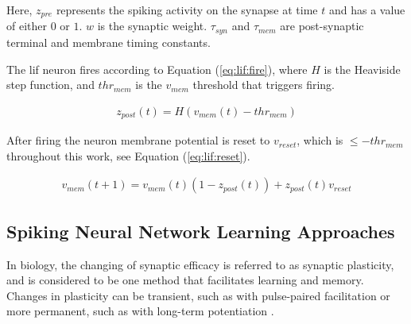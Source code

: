 \documentclass[conference]{IEEEtran}
\newcommand{\asvgf}[4]{
	\begin{figure}[!htbp]
    	\centering
		\adjustbox{max width=#4\linewidth}{}
        \caption{#2.}
        \label{#3}
	\end{figure}
}
\newcommand{\eq}[1]{Equation (\ref{#1})}
\begin{document}
Here, $z_{pre}$ represents the spiking activity on the synapse at time $t$ and
has a value of either $0$ or $1$. $w$ is the synaptic weight. $\tau_{syn}$ and
$\tau_{mem}$ are post-synaptic terminal and membrane timing constants.

The \gls{lif} neuron fires according to \eq{eq:lif:fire}, where $H$ is the
Heaviside step function, and $thr_{mem}$ is the $v_{mem}$ threshold that
triggers firing.

\begin{align}
z_{post}(t) = H(v_{mem}(t) - thr_{mem}) \label{eq:lif:fire}
\end{align}

After firing the neuron membrane potential is reset to $v_{reset}$, which is
$\leq -thr_{mem}$ throughout this work, see \eq{eq:lif:reset}.

\begin{align}
v_{mem}(t+1) = v_{mem}(t)(1 - z_{post}(t)) + z_{post}(t)v_{reset} \label{eq:lif:reset}
\end{align}




\subsection{Spiking Neural Network Learning Approaches}
In biology, the changing of synaptic efficacy is referred to as synaptic
plasticity, and is considered to be one method that facilitates learning and
memory. Changes in plasticity can be transient, such as with pulse-paired
facilitation or more permanent, such as with long-term potentiation
\parencite{ponulak_2011}.
\end{document}
